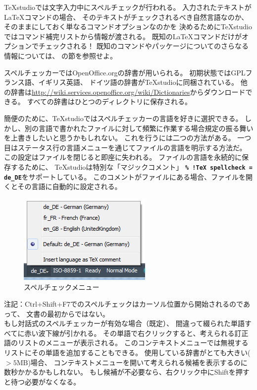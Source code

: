 TeXstudioでは文字入力中にスペルチェックが行われる。
入力されたテキストがLaTeXコマンドの場合、
そのテキストがチェックされるべき自然言語なのか、
そのままにしておく単なるコマンドオプションなのかを
決めるためにTeXstudioではコマンド補完リストから情報が渡される。
既知のLaTeXコマンドだけがオプションでチェックされる！
既知のコマンドやパッケージについてのさらなる情報については、
の節を参照せよ。

スペルチェッカーではOpenOffice.orgの辞書が用いられる。
初期状態ではGPLフランス語、イギリス英語、
ドイツ語の辞書がTeXstudioに同梱されている。
他の辞書は\href{http://wiki.services.openoffice.org/wiki/Dictionaries}{http://wiki.services.openoffice.org/wiki/Dictionaries}からダウンロードできる。
すべての辞書はひとつのディレクトリに保存される。

簡便のために、TeXstudioではスペルチェッカーの言語を好きに選択できる。
しかし、別の言語で書かれたファイルに対して頻繁に作業する場合規定の振る舞いを上書きしたいと思うかもしれない。
これを行うには二つの方法がある。
一つ目はステータス行の言語メニューを通じてファイルの言語を明示する方法だ。
この設定はファイルを閉じると即座に失われる。
ファイルの言語を永続的に保存するために、
TeXstudioは特別な「マジックコメント」
\textbf{\texttt{\% !TeX spellcheck = de\_DE}}をサポートしている。
このコメントがファイルにある場合、ファイルを開くとその言語に自動的に設定される。

\begin{figure}[H]
  \centering
  \includegraphics{spellcheck_menu.png}
  \caption{スペルチェックメニュー}
\end{figure}

注記：Ctrl+Shift+F7でのスペルチェックはカーソル位置から開始されるのであって、
文書の最初からではない。
\\

もし対話式のスペルチェッカーが有効な場合（既定）、
間違って綴られた単語すべてに赤い波下線が引かれる。
その単語で右クリックすると、考えられる訂正語のリストのメニューが表示される。
このコンテキストメニューでは無視するリストにその単語を追加することもできる。
使用している辞書がとても大きい(${}>5\mathrm{MB}$)場合、
コンテキストメニューを開いて考えられる候補を表示するのに数秒かかるかもしれない。
もし候補が不必要なら、右クリック中にShiftを押すと待つ必要がなくなる。
\\

